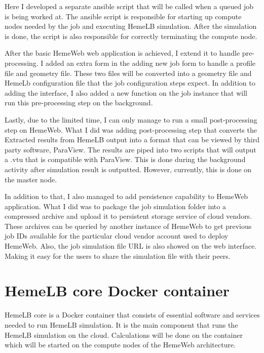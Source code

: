 Here I developed a separate ansible script that will be called when a queued job is being worked at. The ansible script is responsible for starting up compute nodes needed by the job and executing HemeLB simulation. After the simulation is done, the script is also responsible for correctly terminating the compute node.

After the basic HemeWeb web application is achieved, I extend it to handle pre-processing. I added an extra form in the adding new job form to handle a profile file and geometry file. These two files will be converted into a geometry file and HemeLb configuration file that the job configuration steps expect. In addition to adding the interface, I also added a new function on the job instance that will run this pre-processing step on the background. 

Lastly, due to the limited time, I can only manage to run a small post-processing step on HemeWeb. What I did was adding post-processing step that converts the Extracted results from HemeLB output into a format that can be viewed by third party software, ParaView. The results are piped into two scripts that will output a .vtu that is compatible with ParaView. This is done during the background activity after simulation result is outputted. However, currently, this is done on the master node.

In addition to that, I also managed to add persistence capability to HemeWeb application. What I did was to package the job simulation folder into a compressed archive and upload it to persistent storage service of cloud vendors. These archives can be queried by another instance of HemeWeb to get previous job IDs available for the particular cloud vendor account used to deploy HemeWeb.  Also, the job simulation file URL is also showed on the web interface. Making it easy for the users to share the simulation file with their peers.



\section{HemeLB core Docker container}

HemeLB core is a Docker container that consists of essential software and services needed to run HemeLB simulation. It is the main component that runs the HemeLB simulation on the cloud. Calculations will be done on the container which will be started on the compute nodes of the HemeWeb architecture. 

